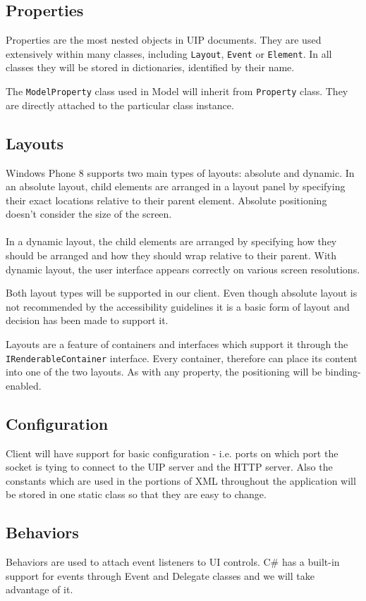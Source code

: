 \subsection{Properties}
Properties are the most nested objects in UIP documents. They are used extensively within many classes, including \texttt{Layout}, \texttt{Event} or \texttt{Element}. In all classes they will be stored in dictionaries, identified by their name.

The \texttt{ModelProperty} class used in Model will inherit from \texttt{Property} class. They are directly attached to the particular class instance.

\subsection{Layouts}
Windows Phone 8 supports two main types of layouts: absolute and dynamic.
In an absolute layout, child elements are arranged in a layout panel by specifying their exact locations relative to their parent element. Absolute positioning doesn't consider the size of the screen.\\\\
In a dynamic layout, the child elements are arranged by specifying how they should be arranged and how they should wrap relative to their parent. With dynamic layout, the user interface appears correctly on various screen resolutions.

Both layout types will be supported in our client. Even though absolute layout is not recommended by the accessibility guidelines \cite{wp8guide} it is a basic form of layout and decision has been made to support it.

Layouts are a feature of containers and interfaces which support it through the \texttt{IRenderableContainer} interface. Every container, therefore can place its content into one of the two layouts. As with any property, the positioning will be binding-enabled.

\subsection{Configuration}
Client will have support for basic configuration - i.e. ports on which port the socket is tying to connect to the UIP server and the HTTP server. Also the constants which are used in the portions of XML throughout the application will be stored in one static class so that they are easy to change. 

\subsection{Behaviors}
Behaviors are used to attach event listeners to UI controls. C\# has a built-in support for events through Event and Delegate classes and we will take advantage of it.

